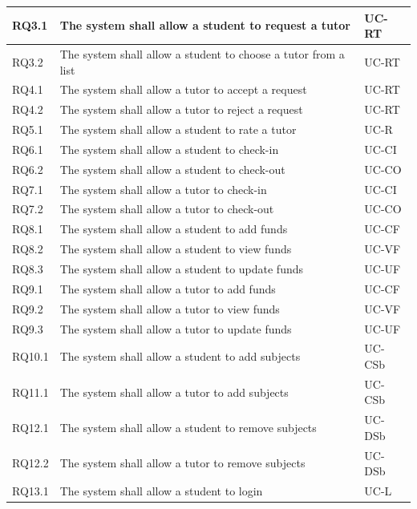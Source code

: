 \documentclass[12pt]{article}
\begin{document}
{\begin{longtable}{| l | p{10cm}| l |}
				RQ3.1 & The system shall allow a student to request a tutor & UC-RT \\ \hline
				RQ3.2 & The system shall allow a student to choose a tutor from a list & UC-RT \\ \hline

				RQ4.1 & The system shall allow a tutor to accept a request & UC-RT \\ \hline
				RQ4.2 & The system shall allow a tutor to reject a request & UC-RT \\ \hline




				RQ5.1 & The system shall allow a student to rate a tutor & UC-R\\ \hline

				RQ6.1 & The system shall allow a student to check-in  & UC-CI \\ \hline
				RQ6.2 & The system shall allow a student to check-out  & UC-CO \\ \hline
				RQ7.1 & The system shall allow a tutor to check-in  & UC-CI \\
\hline
				RQ7.2 & The system shall allow a tutor to check-out  & UC-CO \\ \hline
				RQ8.1 & The system shall allow a student to add funds &UC-CF\\ \hline
				RQ8.2 & The system shall allow a student to view funds &UC-VF\\ \hline
				RQ8.3 & The system shall allow a student to update funds &UC-UF\\ \hline
				RQ9.1 & The system shall allow a tutor to add funds &UC-CF\\ \hline
				RQ9.2 & The system shall allow a tutor to view funds &UC-VF\\ \hline
				RQ9.3 & The system shall allow a tutor to update funds &UC-UF\\ \hline
				RQ10.1 & The system shall allow a student to add subjects &UC-CSb\\ \hline
				RQ11.1 & The system shall allow a tutor to add subjects &UC-CSb\\ \hline
				RQ12.1 & The system shall allow a student to remove subjects &UC-DSb\\ \hline
				RQ12.2 & The system shall allow a tutor to remove subjects &UC-DSb\\ \hline
				RQ13.1 & The system shall allow a student to login &UC-L\\ \hline

\end{longtable}}
\end{document}

